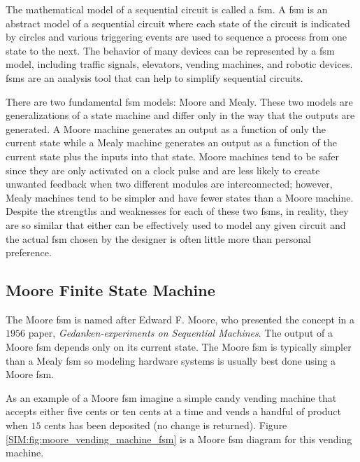 The mathematical model of a sequential circuit is called a \gls{fsm}. A \gls{fsm} is an abstract model of a sequential circuit where each state of the circuit is indicated by circles and various triggering events are used to sequence a process from one state to the next. The behavior of many devices can be represented by a \gls{fsm} model, including traffic signals, elevators, vending machines, and robotic devices. \glspl{fsm} are an analysis tool that can help to simplify sequential circuits. 

There are two fundamental \gls{fsm} models: Moore and Mealy. These two models are generalizations of a state machine and differ only in the way that the outputs are generated. A Moore machine generates an output as a function of only the current state while a Mealy machine generates an output as a function of the current state plus the inputs into that state. Moore machines tend to be safer since they are only activated on a clock pulse and are less likely to create unwanted feedback when two different modules are interconnected; however, Mealy machines tend to be simpler and have fewer states than a Moore machine. Despite the strengths and weaknesses for each of these two \glspl{fsm}, in reality, they are so similar that either can be effectively used to model any given circuit and the actual \gls{fsm} chosen by the designer is often little more than personal preference. 

\subsection{Moore Finite State Machine}
\label{SIM:subsec:moore_finite_state_machine}

The Moore \gls{fsm} is named after Edward F. Moore, who presented the concept in a $ 1956 $ paper, \emph{Gedanken-experiments on Sequential Machines}. The output of a Moore \gls{fsm} depends only on its current state. The Moore \gls{fsm} is typically simpler than a Mealy \gls{fsm} so modeling hardware systems is usually best done using a Moore \gls{fsm}. 

As an example of a Moore \gls{fsm} imagine a simple candy vending machine that accepts either five cents or ten cents at a time and vends a handful of product when $ 15 $ cents has been deposited (no change is returned). Figure \ref{SIM:fig:moore_vending_machine_fsm} is a Moore \gls{fsm} diagram for this vending machine.

